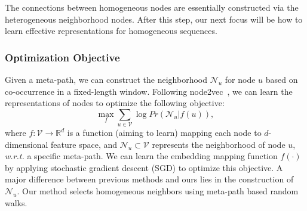  The connections between homogeneous nodes are essentially constructed via the heterogeneous neighborhood nodes. After this step, our next focus will be how to learn effective representations for homogeneous sequences.

\subsubsection{Optimization Objective}
Given a meta-path, we can construct the neighborhood $\mathcal{N}_u$ for node $u$ based on co-occurrence in a fixed-length window.
Following node2vec~\cite{grover2016node2vec}, we can learn the representations of nodes to optimize the following objective:
\begin{equation}
\max_f \sum_{u \in \mathcal{V}}{\log Pr(\mathcal{N}_u | f(u))},
\end{equation}
where $f: \mathcal{V} \rightarrow \mathbb{R}^d$ is a function (aiming to learn) mapping each node to $d$-dimensional feature space, and $\mathcal{N}_u  \subset \mathcal{V}$ represents the neighborhood of node $u$, \emph{w.r.t.} a specific meta-path. We can learn the embedding mapping function $f(\cdot)$ by applying stochastic gradient descent (SGD) to optimize this objective. %
A major difference between previous methods and ours lies in the construction of $\mathcal{N}_u$. Our method selects homogeneous neighbors using meta-path based random walks. %

%
%


